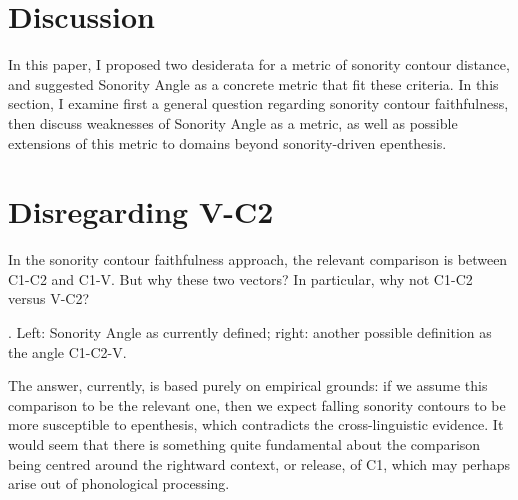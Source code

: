 \documentclass[12pt]{article}
\begin{document}
\section{Discussion} \label{issues}

In this paper, I proposed two desiderata for a metric of sonority contour distance, and suggested {\sc Sonority Angle} as a concrete metric that fit these criteria. In this section, I examine first a general question regarding sonority contour faithfulness, then discuss weaknesses of {\sc Sonority Angle} as a metric, as well as possible extensions of this metric to domains beyond sonority-driven epenthesis.

\section{Disregarding V-C2} 

In the sonority contour faithfulness approach, the relevant comparison is between C1-C2 and C1-V. But why these two vectors? In particular, why not C1-C2 versus V-C2?

\ex. Left: {\sc Sonority Angle} as currently defined; right: another possible definition as the angle C1-C2-V.

\begin{center}
\end{center}

The answer, currently, is based purely on empirical grounds: if we assume this comparison to be the relevant one, then we expect falling sonority contours to be more susceptible to epenthesis, which contradicts the cross-linguistic evidence. It would seem that there is something quite fundamental about the comparison being centred around the rightward context, or release, of C1, which may perhaps arise out of phonological processing.
\end{document}
